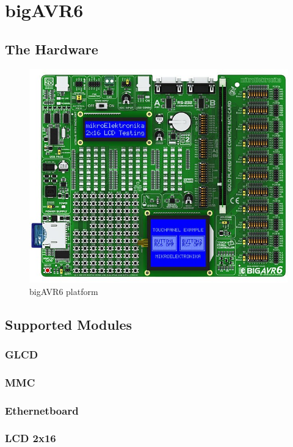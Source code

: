 
\chapter{bigAVR6} \label{chapter:bigAVR6}


\section{The Hardware}

\begin{figure}[h]
 \centerline{\includegraphics[width=.5\columnwidth]{pics/bigavr6.png}}
  \caption{bigAVR6 platform}
  \label{fig:bigavr6}
\end{figure}

\section{Supported Modules}

\subsection{GLCD}

\subsection{MMC}

\subsection{Ethernetboard}

\subsection{LCD 2x16}



